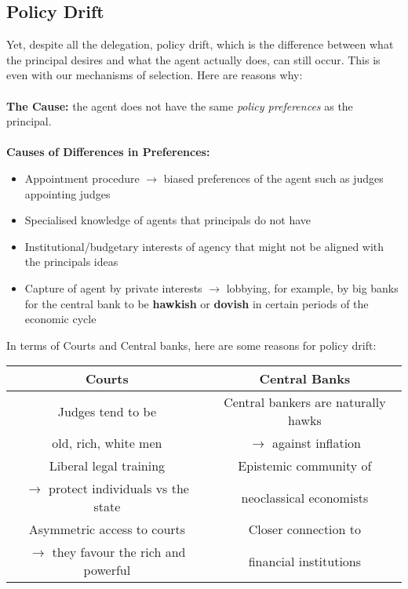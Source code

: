 \documentclass[12pt, letterpaper]{article}
\begin{document}
\subsection{Policy Drift}
Yet, despite all the delegation, policy drift, which is the difference between what the principal desires and what the agent actually does, can still occur. This is even with our mechanisms of selection. Here are reasons why:\\\\
\textbf{The Cause:} the agent does not have the same \textit{policy preferences} as the principal.\\\\
\textbf{Causes of Differences in Preferences:}
\begin{itemize}
	\item Appointment procedure $\rightarrow$ biased preferences of the agent such as judges appointing judges
	\item Specialised knowledge of agents that principals do not have
	\item Institutional/budgetary interests of agency that might not be aligned with the principals ideas
	\item Capture of agent by private interests $\rightarrow$ lobbying, for example, by big banks for the central bank to be \textbf{hawkish} or \textbf{dovish} in certain periods of the economic cycle
\end{itemize}
In terms of Courts and Central banks, here are some reasons for policy drift:
\begin{center}
\begin{adjustbox}{width=.85\textwidth}
\begin{tabular}{c|c}
Courts & Central Banks\\
\hline
Judges tend to be & Central bankers are naturally hawks \\ 
old, rich, white men & $\rightarrow$ against inflation \\
Liberal legal training  & Epistemic community of \\ $\rightarrow$ protect individuals vs the state & neoclassical economists\\
Asymmetric access to courts & Closer connection to \\  $\rightarrow$ they favour the rich and powerful & financial institutions\\
\hline
\end{tabular}
\end{adjustbox}
\end{center}
\end{document}
